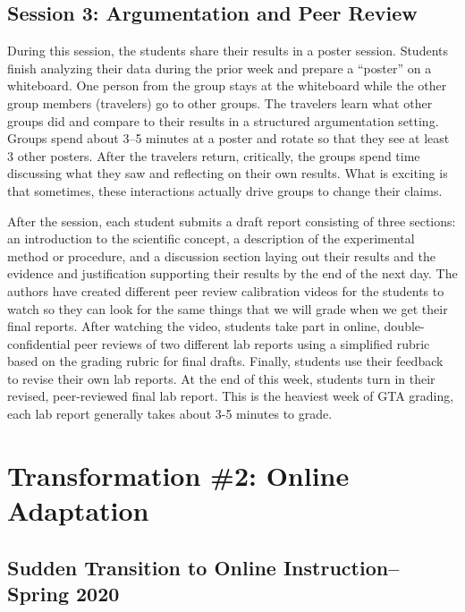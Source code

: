 \documentclass[aip, numerical, preprint]{revtex4-2}
\begin{document}
\subsection{Session 3: Argumentation and Peer Review}
During this session, the students share their results in a poster session.  Students finish analyzing
their data during the prior week and prepare a ``poster'' on a whiteboard.  One person from
the group stays at the whiteboard while the other group members (travelers) go to other groups.
The travelers learn what other groups did and compare to their results in a structured
argumentation setting.  Groups spend about 3--5 minutes at a poster and rotate so that they
see at least 3 other posters.  After the travelers return, critically, the groups spend time
discussing what they saw and reflecting on their own results.  What is exciting is that
sometimes, these interactions actually drive groups to change their claims.\citep{Walker2019}

After the session, each student submits a draft report consisting of three sections: an 
introduction to the
scientific concept, a description of the experimental method or procedure, and a discussion
section laying out their results and the evidence and justification supporting their results by the 
end of the next day.
The authors have created different peer review calibration videos for the students to watch so
they can look for the same things that we will grade when we get their
final reports.  After watching the video, students take part in online, double-confidential peer 
reviews of two different lab reports using a simplified rubric based on the grading rubric for final drafts.
Finally, students use their feedback to revise their own lab reports.  At the end of
this week, students turn in their revised, peer-reviewed final lab report.  This is the
heaviest week of GTA grading, each lab report generally takes about 3-5 minutes to grade.

\section{Transformation \#2: Online Adaptation}

\subsection{Sudden Transition to Online Instruction--Spring 2020}
\end{document}

